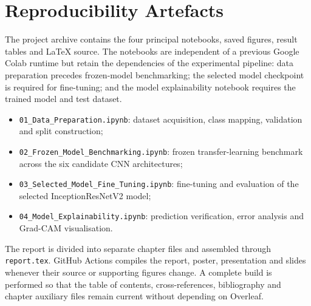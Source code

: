 \chapter{Reproducibility Artefacts}
\label{app:reproducibility}

The project archive contains the four principal notebooks, saved figures, result tables and LaTeX source. The notebooks are independent of a previous Google Colab runtime but retain the dependencies of the experimental pipeline: data preparation precedes frozen-model benchmarking; the selected model checkpoint is required for fine-tuning; and the model explainability notebook requires the trained model and test dataset.

\begin{itemize}
    \item \texttt{01\_Data\_Preparation.ipynb}: dataset acquisition, class mapping, validation and split construction;
    
    \item \texttt{02\_Frozen\_Model\_Benchmarking.ipynb}: frozen transfer-learning benchmark across the six candidate CNN architectures;
    
    \item \texttt{03\_Selected\_Model\_Fine\_Tuning.ipynb}: fine-tuning and evaluation of the selected InceptionResNetV2 model;
    
    \item \texttt{04\_Model\_Explainability.ipynb}: prediction verification, error analysis and Grad-CAM visualisation.
\end{itemize}

The report is divided into separate chapter files and assembled through \texttt{report.tex}. GitHub Actions compiles the report, poster, presentation and slides whenever their source or supporting figures change. A complete build is performed so that the table of contents, cross-references, bibliography and chapter auxiliary files remain current without depending on Overleaf.
